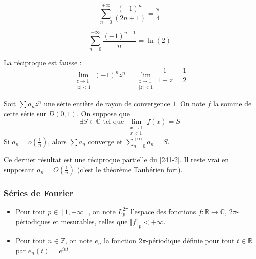   \begin{application}
    \[ \sum_{n=0}^{+\infty} \frac{(-1)^n}{(2n+1)} = \frac{\pi}{4} \]
  \end{application}

  \begin{application}
    \[ \sum_{n=0}^{+\infty} \frac{(-1)^{n-1}}{n} = \ln(2) \]
  \end{application}

  \begin{cexample}
    La réciproque est fausse :
    \[ \lim_{\substack{z \rightarrow 1 \\ \vert z \vert < 1}} (-1)^n z^n = \lim_{\substack{z \rightarrow 1 \\ \vert z \vert < 1}} \frac{1}{1+z} = \frac{1}{2} \]
  \end{cexample}

  \begin{theorem}
    Soit $\sum a_n z^n$ une série entière de rayon de convergence $1$. On note $f$ la somme de cette série sur $D(0,1)$. On suppose que
    \[ \exists S \in \mathbb{C} \text{ tel que } \lim_{\substack{x \rightarrow 1 \\ x < 1}} f(x) = S \]
    Si $a_n = o \left( \frac{1}{n} \right)$, alors $\sum a_n$ converge et $\sum_{n=0}^{+\infty} a_n = S$.
  \end{theorem}

  \begin{remark}
    Ce dernier résultat est une réciproque partielle du \cref{241-2}. Il reste vrai en supposant $a_n = O \left( \frac{1}{n} \right)$ (c'est le théorème Taubérien fort).
  \end{remark}

  \subsubsection{Séries de Fourier}


  \begin{notation}
    \begin{itemize}
      \item Pour tout $p \in [1, +\infty]$, on note $L_p^{2\pi}$ l'espace des fonctions $f : \mathbb{R} \rightarrow \mathbb{C}$, $2\pi$-périodiques et mesurables, telles que $\Vert f \Vert_p < +\infty$.
      \item Pour tout $n \in \mathbb{Z}$, on note $e_n$ la fonction $2\pi$-périodique définie pour tout $t \in \mathbb{R}$ par $e_n(t) = e^{int}$.
    \end{itemize}
  \end{notation}


